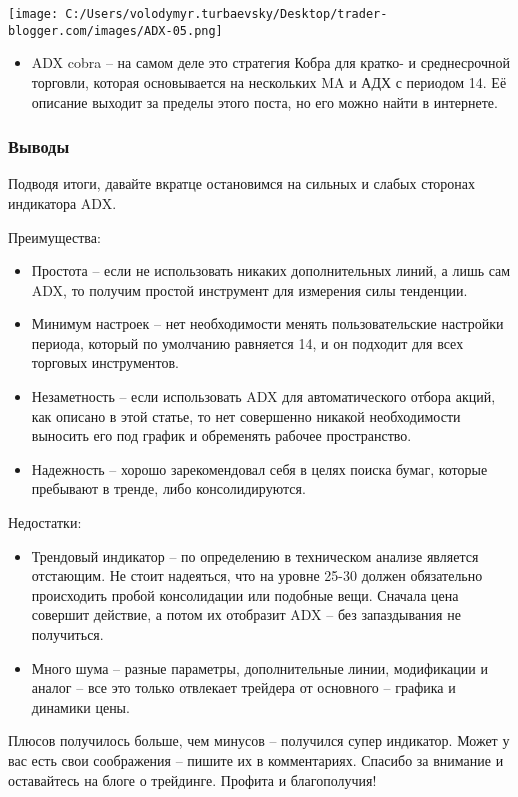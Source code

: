 \documentclass[a5paper]{article}
\begin{document}
\texttt{[image: C:/Users/volodymyr.turbaevsky/Desktop/trader-blogger.com/images/ADX-05.png]}

\begin{itemize}
\item     ADX cobra – на самом деле это стратегия Кобра для кратко- и среднесрочной торговли, которая основывается на нескольких MA и АДХ с периодом 14. Её описание выходит за пределы этого поста, но его можно найти в интернете.
\end{itemize}

\subsubsection{Выводы}

Подводя итоги, давайте вкратце остановимся на сильных и слабых сторонах индикатора ADX.

Преимущества:
\begin{itemize}
\item     Простота – если не использовать никаких дополнительных линий, а лишь сам ADX, то получим простой инструмент для измерения силы тенденции.
\item     Минимум настроек – нет необходимости менять пользовательские настройки периода, который по умолчанию равняется 14, и он подходит для всех торговых инструментов.
\item     Незаметность – если использовать ADX для автоматического отбора акций, как описано в этой статье, то нет совершенно никакой необходимости выносить его под график и обременять рабочее пространство.
\item     Надежность – хорошо зарекомендовал себя в целях поиска бумаг, которые пребывают в тренде, либо консолидируются.
  \end{itemize}

Недостатки:
\begin{itemize}
\item     Трендовый индикатор – по определению в техническом анализе является отстающим. Не стоит надеяться, что на уровне 25-30 должен обязательно происходить пробой консолидации или подобные вещи. Сначала цена совершит действие, а потом их отобразит ADX – без запаздывания не получиться.
\item     Много шума – разные параметры, дополнительные линии, модификации и аналог – все это только отвлекает трейдера от основного – графика и динамики цены.
\end{itemize}

Плюсов получилось больше, чем минусов – получился супер индикатор. Может у вас есть свои соображения – пишите их в комментариях. Спасибо за внимание и оставайтесь на блоге о трейдинге. Профита и благополучия!
\end{document}
